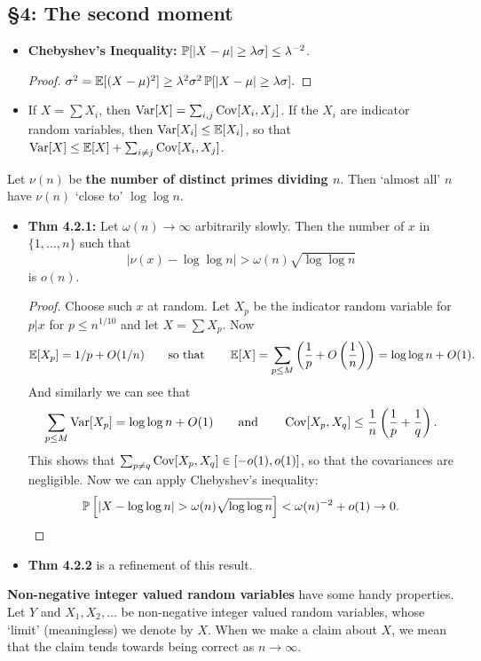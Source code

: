 \documentclass[11pt]{article}
\newenvironment{INT}[1][]{\begin{itemize}\small\item\textbf{#1}}{\end{itemize}}
\newcommand{\moreINT}[1][]{\item\textbf{#1}}
\begin{document}
\begin{chapter4}
\section*{\S4: The second moment}
\begin{itemise}
\item \begin{INT}[Chebyshev's Inequality:]
$\operatorname{\mathbb{P}}[|X-\mu|\geq\lambda\sigma]\leq\lambda^{-2}$.
\begin{proof}
$\sigma^2=\operatorname{\mathbb{E}}[(X-\mu)^2]\geq\lambda^2\sigma^2\operatorname{\mathbb{P}}[|X-\mu|\geq\lambda\sigma].$
\end{proof}
\item If $X=\sum X_i$, then $\operatorname{Var}[X]=\sum_{i,j}\operatorname{Cov}[X_i,X_j]$. If the $X_i$ are indicator random variables, then $\operatorname{Var}[X_i]\leq\operatorname{\mathbb{E}}[X_i]$, so that $\operatorname{Var}[X]\leq\operatorname{\mathbb{E}}[X]+\sum_{i\neq j}\operatorname{Cov}[X_i,X_j]$.
\end{INT}
\item Let $\nu(n)$ be \textbf{the number of distinct primes dividing $n$}. Then `almost all' $n$ have $\nu(n)$ `close to' $\log\log n$.
\begin{INT}[Thm 4.2.1:] Let $\omega(n)\rightarrow\infty$ arbitrarily slowly. Then the number of $x$ in $\{1,\ldots,n\}$ such that
\[|\nu(x)-\log\log n|>\omega(n)\sqrt{\log\log n}\]
is $o(n)$.
\begin{proof}
Choose such $x$ at random. Let $X_p$ be the indicator random variable for $p|x$ for $p\leq n^{1/10}$ and let $X=\sum X_p$. Now
\[\operatorname{\mathbb{E}}[X_p]=1/p+O(1/n)\textup{\qquad so that\qquad}\operatorname{\mathbb{E}}[X]=\sum_{p\leq M}\left(\frac{1}{p}+O\left(\frac{1}{n}\right)\right)=\log\log n+O(1).\]
And similarly we can see that
\[\sum_{p\leq M}\operatorname{Var}[X_p]=\log\log n+O(1)\textup{\qquad and\qquad}\operatorname{Cov}[X_p,X_q]\leq\frac{1}{n}\left(\frac{1}{p}+\frac{1}{q}\right).\]
This shows that $\sum_{p\neq q}\operatorname{Cov}[X_p,X_q]\in[-o(1),o(1)]$, so that the covariances are negligible. Now we can apply Chebyshev's inequality:
\[\Prob\left[|X-\log\log n|>\omega(n)\sqrt{\log\log n}\right]<\omega(n)^{-2}+o(1)\rightarrow0.\qedhere\]
\end{proof}
\moreINT[Thm 4.2.2] is a refinement of this result.
\end{INT}
\item \textbf{Non-negative integer valued random variables} have some handy properties. Let $Y$ and $X_1,X_2,\ldots$ be non-negative integer valued random variables, whose `limit' (meaningless) we denote by $X$. When we make a claim about $X$, we mean that the claim tends towards being correct as $n\rightarrow \infty$.

\end{itemise}
\end{chapter4}
\end{document}
